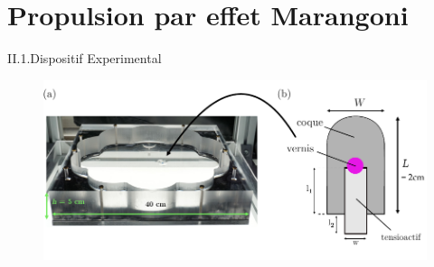 \documentclass[aspectratio=169,10pt]{beamer}
\begin{document}
\section{Propulsion par effet Marangoni}

\begin{frame}{II.1.Dispositif Experimental}
    \begin{figure}
        \centering
        \includegraphics[width=.55\textwidth]{./figures/Dispositif_Exp_Bateau_Marangoni_v2.pdf}\\
    \end{figure}
\end{frame}

\end{document}
